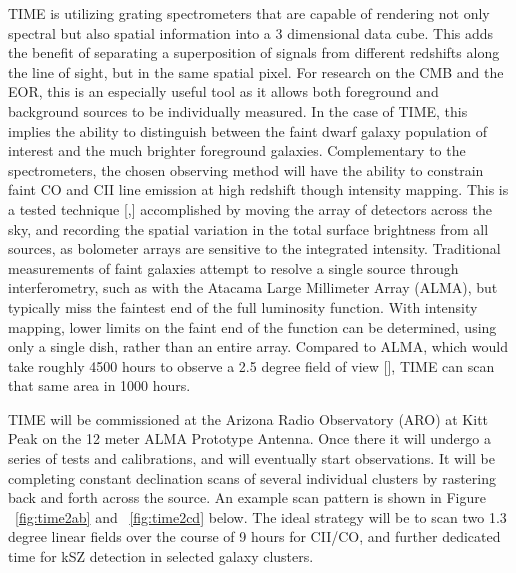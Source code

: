 \documentclass[manuscript]{aastex}
\begin{document}
TIME is utilizing grating spectrometers that are capable of rendering not only spectral but also spatial information into a 3 dimensional data cube. This adds the benefit of separating a superposition of signals from different redshifts along the line of sight, but in the same spatial pixel. For research on the CMB and the EOR, this is an especially useful tool as it allows both foreground and background sources to be individually measured. In the case of TIME, this implies the ability to distinguish between the faint dwarf galaxy population of interest and the much brighter foreground galaxies. 
Complementary to the spectrometers, the chosen observing method will have the ability to constrain faint CO and CII line emission at high redshift though intensity mapping. This is a tested technique [\cite{Keating2015},\cite{Keating2016}] accomplished by moving the array of detectors across the sky, and recording the spatial variation in the total surface brightness from all sources, as bolometer arrays are sensitive to the integrated intensity. Traditional measurements of faint galaxies attempt to resolve a single source through interferometry, such as with the Atacama Large Millimeter Array (ALMA), but typically miss the faintest end of the full luminosity function. With intensity mapping, lower limits on the faint end of the function can be determined, using only a single dish, rather than an entire array. Compared to ALMA, which would take roughly 4500 hours to observe a 2.5 degree field of view [\cite{Kovetz2017}], TIME can scan that same area in 1000 hours. 

TIME will be commissioned at the Arizona Radio Observatory (ARO) at Kitt Peak on the 12 meter ALMA Prototype Antenna. Once there it will undergo a series of tests and calibrations, and will eventually start observations. It will be completing constant declination scans of several individual clusters by rastering back and forth across the source. An example scan pattern is shown in Figure ~\ref{fig:time2ab}  and ~\ref{fig:time2cd} below. The ideal strategy will be to scan two 1.3 degree linear fields over the course of 9 hours for CII/CO, and further dedicated time for kSZ detection in selected galaxy clusters.
\end{document}
